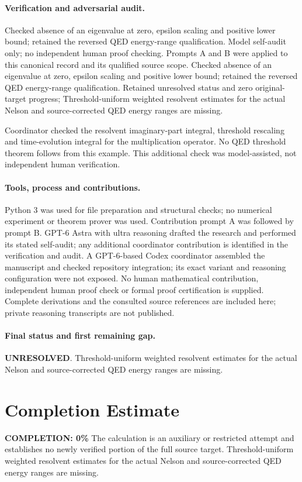 \documentclass[11pt]{article}
\begin{document}
\paragraph{Verification and adversarial audit.}
Checked absence of an eigenvalue at zero, epsilon scaling and positive lower bound; retained the reversed QED energy-range qualification. Model self-audit only; no independent human proof checking. Prompts A and B were applied to this canonical record and its qualified source scope. Checked absence of an eigenvalue at zero, epsilon scaling and positive lower bound; retained the reversed QED energy-range qualification. Retained unresolved status and zero original-target progress; Threshold-uniform weighted resolvent estimates for the actual Nelson and source-corrected QED energy ranges are missing.

Coordinator checked the resolvent imaginary-part integral, threshold rescaling and time-evolution integral for the multiplication operator. No QED threshold theorem follows from this example. This additional check was model-assisted, not independent human verification.

\paragraph{Tools, process and contributions.}
Python 3 was used for file preparation and structural checks; no numerical experiment or theorem prover was used. Contribution prompt A was followed by prompt B. GPT-6 Astra with ultra reasoning drafted the research and performed its stated self-audit; any additional coordinator contribution is identified in the verification and audit. A GPT-6-based Codex coordinator assembled the manuscript and checked repository integration; its exact variant and reasoning configuration were not exposed. No human mathematical contribution, independent human proof check or formal proof certification is supplied. Complete derivations and the consulted source references are included here; private reasoning transcripts are not published.

\paragraph{Final status and first remaining gap.}
\textbf{UNRESOLVED}. Threshold-uniform weighted resolvent estimates for the actual Nelson and source-corrected QED energy ranges are missing.

\section{Completion Estimate}
\noindent\textbf{COMPLETION: 0\%}
The calculation is an auxiliary or restricted attempt and establishes no newly verified portion of the full source target. Threshold-uniform weighted resolvent estimates for the actual Nelson and source-corrected QED energy ranges are missing.
\end{document}
